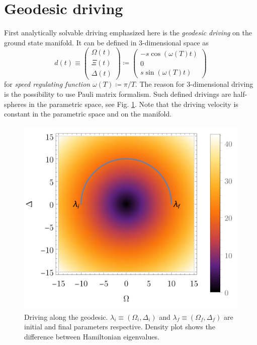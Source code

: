 \section{Geodesic driving}
First analytically solvable driving emphasized here is the \emph{geodesic driving} on the ground state manifold. It can be defined in 3-dimensional space as
\begin{equation}
    d(t)\equiv \begin{pmatrix}
        \Omega(t)\\
        \Xi(t)\\
        \Delta(t)
    \end{pmatrix}\coloneqq \begin{pmatrix}
        -s \cos(\omega(T)t)\\
        0\\
        s \sin(\omega(T)t)
    \end{pmatrix}
\end{equation}
for \emph{speed regulating function} $\omega(T)\coloneqq \pi/T$. The reason for 3-dimensional driving is the possibility to use Pauli matrix formalism. Such defined drivings are half-spheres in the parametric space, see Fig. \ref{fig:driving}. Note that the driving velocity is constant in the parametric space and on the manifold.

\begin{figure}[h]
    \centering
    \includegraphics[scale=1.2]{../img/driving.pdf}
    \caption{Driving along the geodesic. $\lambda_i\equiv (\Omega_i,\Delta_i)$ and $\lambda_f\equiv (\Omega_f,\Delta_f)$ are initial and final parameters respective. Density plot shows the difference between Hamiltonian eigenvalues.}
    \label{fig:driving}
\end{figure}

